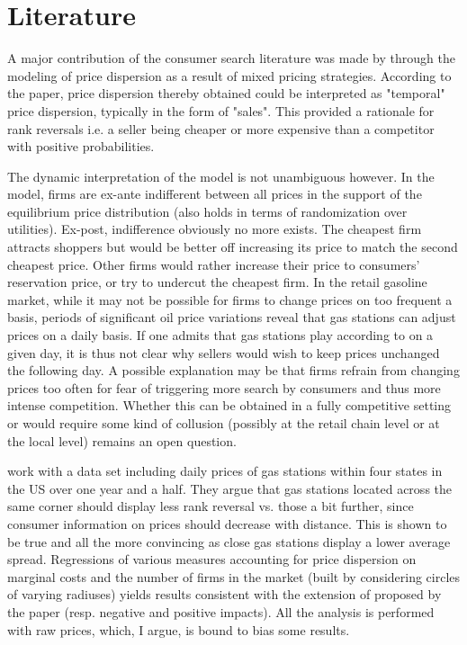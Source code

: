 \documentclass[english]{article}
\begin{document}
\section{Literature}

A major contribution of the consumer search literature was made by \cite{VAR80} through the modeling of price dispersion as a result of mixed pricing strategies. According to the paper, price dispersion thereby obtained could be interpreted as "temporal" price dispersion, typically in the form of "sales". This provided a rationale for rank reversals i.e. a seller being cheaper or more expensive than a competitor with positive probabilities.

The dynamic interpretation of the model is not unambiguous however. In the model, firms are ex-ante indifferent between all prices in the support of the equilibrium price distribution (also holds in terms of randomization over utilities). Ex-post, indifference obviously no more exists. The cheapest firm attracts shoppers but would be better off increasing its price to match the second cheapest price. Other firms would rather increase their price to consumers' reservation price, or try to undercut the cheapest firm. In the retail gasoline market, while it may not be possible for firms to change prices on too frequent a basis, periods of significant oil price variations reveal that gas stations can adjust prices on a daily basis. If one admits that gas stations play according to \cite{VAR80} on a given day, it is thus not clear why sellers would wish to keep prices unchanged the following day. A possible explanation may be that firms refrain from changing prices too often for fear of triggering more search by consumers and thus more intense competition. Whether this can be obtained in a fully competitive setting  or would require some kind of collusion (possibly at the retail chain level or at the local level) remains an open question.

\cite{TAP11} work with a data set including daily prices of gas stations within four states in the US over one year and a half. They argue that gas stations located across the same corner should display less rank reversal vs. those a bit further, since consumer information on prices should decrease with distance. This is shown to be true and all the more convincing as close gas stations display a lower average spread. Regressions of various measures accounting for price dispersion on marginal costs and the number of firms in the market (built by considering circles of varying radiuses) yields results consistent with the extension of \cite{VAR80} proposed by the paper (resp. negative and positive impacts). All the analysis is performed with raw prices, which, I argue, is bound to bias some results.
\end{document}
